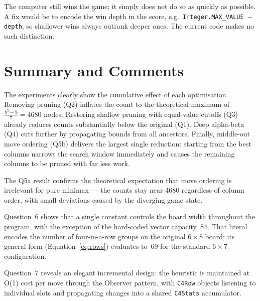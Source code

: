 \documentclass[language=english,titlepage=false,smartquotes=true]{hgbreport}
\begin{document}
The computer still wins the game; it simply does not do so as quickly as
possible. A fix would be to encode the win depth in the score, e.g.\
\texttt{Integer.MAX\_VALUE\,$-$\,depth}, so shallower wins always outrank
deeper ones. The current code makes no such distinction.

\section*{Summary and Comments}

The experiments clearly show the cumulative effect of each optimisation.
Removing pruning (Q2) inflates the count to the theoretical maximum of
$\frac{8^{5}-8}{7} = 4680$ nodes. Restoring shallow pruning with equal-value
cutoffs (Q3) already reduces counts substantially below the original (Q1).
Deep alpha-beta (Q4) cuts further by propagating bounds from all ancestors.
Finally, middle-out move ordering (Q5b) delivers the largest single reduction:
starting from the best columns narrows the search window immediately and
causes the remaining columns to be pruned with far less work.

The Q5a result confirms the theoretical expectation that move ordering is
irrelevant for pure minimax --- the counts stay near 4680 regardless of column
order, with small deviations caused by the diverging game state.

Question~6 shows that a single constant controls the board width throughout
the program, with the exception of the hard-coded vector capacity~84. That
literal encodes the number of four-in-a-row groups on the original
$6 \times 8$ board; its general form (Equation~\ref{eq:rows}) evaluates to~69
for the standard $6 \times 7$ configuration.

Question~7 reveals an elegant incremental design: the heuristic is maintained
at O(1) cost per move through the Observer pattern, with \texttt{C4Row}
objects listening to individual slots and propagating changes into a shared
\texttt{C4Stats} accumulator.

\end{document}
